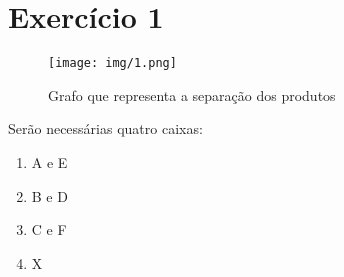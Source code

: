 \section{Exercício 1} 

\begin{figure}[h!]
	\caption{Grafo que representa a separação dos produtos}
	\texttt{[image: img/1.png]}
\end{figure}


Serão necessárias quatro caixas:

\begin{enumerate}
	\item A e E
	\item B e D
	\item C e F
	\item X
\end{enumerate}
